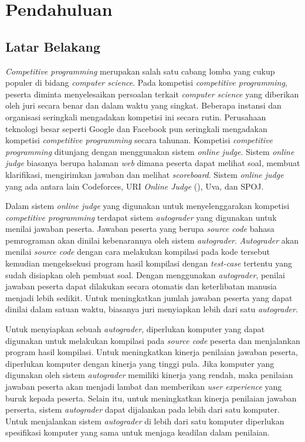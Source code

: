 \chapter{Pendahuluan}

\section{Latar Belakang}

\par \textit{Competitive programming} merupakan salah satu cabang lomba yang cukup populer di bidang \textit{computer science}. Pada kompetisi \textit{competitive programming}, peserta diminta menyelesaikan persoalan terkait \textit{computer science} yang diberikan oleh juri secara benar dan dalam waktu yang singkat. Beberapa instansi dan organisasi seringkali mengadakan kompetisi ini secara rutin. Perusahaan teknologi besar seperti Google dan Facebook pun seringkali mengadakan kompetisi \textit{competitive programming} secara tahunan. Kompetisi \textit{competitive programming} ditunjang dengan menggunakan sistem \textit{online judge}. Sistem \textit{online judge} biasanya berupa halaman \textit{web} dimana peserta dapat melihat soal, membuat klarifikasi, mengirimkan jawaban dan melihat \textit{scoreboard}. Sistem \textit{online judge} yang ada antara lain Codeforces, URI \textit{Online Judge} (\cite{uriojpaper}), Uva, dan SPOJ.

\par Dalam sistem \textit{online judge} yang digunakan untuk menyelenggarakan kompetisi \textit{competitive programming} terdapat sistem \textit{autograder} yang digunakan untuk menilai jawaban peserta. Jawaban peserta yang berupa \textit{source code} bahasa pemrograman akan dinilai kebenarannya oleh sistem \textit{autograder}. \textit{Autograder} akan menilai \textit{source code} dengan cara melakukan kompilasi pada kode tersebut kemudian mengeksekusi program hasil kompilasi dengan \textit{test-case} tertentu yang sudah disiapkan oleh pembuat soal. Dengan menggunakan \textit{autograder}, penilai jawaban peserta dapat dilakukan secara otomatis dan keterlibatan manusia menjadi lebih sedikit. Untuk meningkatkan jumlah jawaban peserta yang dapat dinilai dalam satuan waktu, biasanya juri menyiapkan lebih dari satu \textit{autograder}.

\par Untuk menyiapkan sebuah \textit{autograder}, diperlukan komputer yang dapat digunakan untuk melakukan kompilasi pada \textit{source code} peserta dan menjalankan program hasil kompilasi. Untuk meningkatkan kinerja penilaian jawaban peserta, diperlukan komputer dengan kinerja yang tinggi pula. Jika komputer yang digunakan oleh sistem \textit{autograder} memiliki kinerja yang rendah, maka penilaian jawaban peserta akan menjadi lambat dan memberikan \textit{user experience} yang buruk kepada peserta. Selain itu, untuk meningkatkan kinerja penilaian jawaban perserta, sistem \textit{autograder} dapat dijalankan pada lebih dari satu komputer. Untuk menjalankan sistem \textit{autograder} di lebih dari satu komputer diperlukan spesifikasi komputer yang sama untuk menjaga keadilan dalam penilaian.

